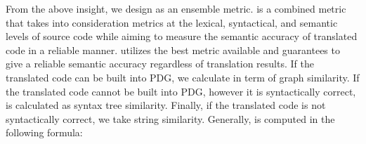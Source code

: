 


From the above insight, we design {\model} as an ensemble %
metric. {\model} is a combined metric that takes into consideration
metrics at the lexical, syntactical, and semantic levels of source
code while aiming to measure the semantic accuracy of translated code
in a reliable manner. {\model} utilizes the best metric available and
guarantees to give a reliable semantic accuracy regardless of
translation results. If the translated code can be built into PDG, we
calculate {\model} in term of graph similarity. If the translated code 
cannot be built into PDG, however it is syntactically correct, {\model} 
is calculated as syntax tree similarity. Finally, if the translated code 
is not syntactically correct, we take string similarity. Generally, {\model} 
is computed in the following formula:

